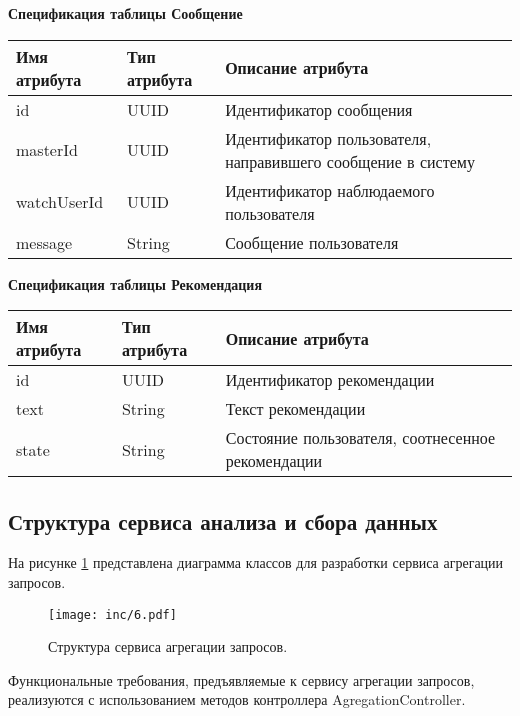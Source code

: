 \textbf{Спецификация таблицы Сообщение}

\begin{table}[H]
\begin{center}
\begin{tabular}{|C{4cm}|C{4cm}|C{6cm}|}
\hline
\textbf{Имя атрибута} & \textbf{Тип атрибута} & \textbf{Описание атрибута} \\ \hline
id & UUID & Идентификатор сообщения \\ \hline
masterId & UUID & Идентификатор пользователя, направившего сообщение в систему \\ \hline
watchUserId & UUID & Идентификатор наблюдаемого пользователя \\ \hline
message & String & Сообщение пользователя \\ \hline
\end{tabular}
\end{center}
\end{table}

\textbf{Спецификация таблицы Рекомендация}
\begin{table}[H]
\begin{center}
\begin{tabular}{|C{4cm}|C{4cm}|C{6cm}|}
\hline
\textbf{Имя атрибута} & \textbf{Тип атрибута} & \textbf{Описание атрибута} \\ \hline
id & UUID & Идентификатор рекомендации \\ \hline
text & String & Текст рекомендации \\ \hline
state & String & Состояние пользователя, соотнесенное рекомендации \\ \hline
\end{tabular}
\end{center}
\end{table}

\subsection{Структура сервиса анализа и сбора данных}

На рисунке \ref{img:anal} представлена диаграмма классов для разработки сервиса агрегации запросов.

\begin{figure}[H]
	\centering
	\texttt{[image: inc/6.pdf]}
	\caption{ Структура сервиса агрегации запросов.}
	\label{img:anal}
\end{figure}

Функциональные требования, предъявляемые к сервису агрегации запросов, реализуются с использованием методов контроллера AgregationController.

